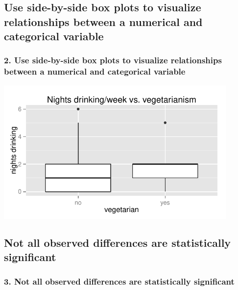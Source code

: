 \documentclass[compress,11pt,t,professionalfonts,xcolor=table]{beamer}
\begin{document}

\subsection{Use side-by-side box plots to visualize relationships between a numerical and categorical variable}
\label{mi2}


\begin{frame}[fragile]
\frametitle{2. Use side-by-side box plots to visualize relationships between a numerical and categorical variable}


\begin{center}
\includegraphics[width=0.9\textwidth]{figures/survey/box_drinks_veg}
\end{center}

\note{

}

\end{frame}


\subsection{Not all observed differences are statistically significant}
\label{mi3}


\begin{frame}
\frametitle{3. Not all observed differences are statistically significant}

\vfill


\vfill

\end{frame}
\end{document}
